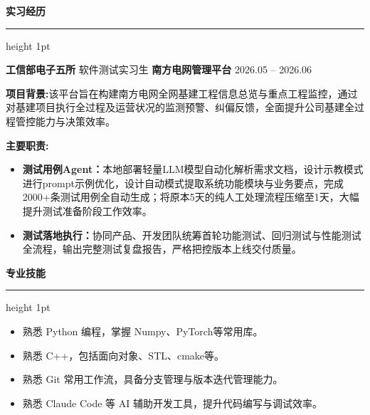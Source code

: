 \documentclass[10pt, a4paper]{ctexart}
\newcommand{\cvsection}[1]{
    \vspace{2ex}
    {\large\bfseries #1}
    \vspace{0.5ex}
    \hrule height 1pt
    \vspace{1.5ex}
}
\begin{document}
\cvsection{\textcolor[HTML]{365F91}{实习经历}}
\textbf{工信部电子五所} \quad \quad 软件测试实习生  \quad \quad \textbf{南方电网管理平台} \hfill 2026.05 -- 2026.06

\textbf{项目背景:}该平台旨在构建南方电网全网基建工程信息总览与重点工程监控，通过对基建项目执行全过程及运营状况的监测预警、纠偏反馈，全面提升公司基建全过程管控能力与决策效率。

\textbf{主要职责:}

\begin{itemize}[leftmargin=1.5em, itemsep=0pt, parsep=0pt, topsep=0.5ex]
\item \textbf{测试用例Agent：}本地部署轻量LLM模型自动化解析需求文档，设计示教模式进行prompt示例优化，设计自动模式提取系统功能模块与业务要点，完成2000+条测试用例全自动生成；将原本5天的纯人工处理流程压缩至1天，大幅提升测试准备阶段工作效率。
\item \textbf{测试落地执行：}协同产品、开发团队统筹首轮功能测试、回归测试与性能测试全流程，输出完整测试复盘报告，严格把控版本上线交付质量。
\end{itemize}

\cvsection{\textcolor[HTML]{365F91}{专业技能 }}
\begin{itemize}[leftmargin=1.5em, itemsep=0pt, parsep=0pt, topsep=0ex]
    \item 熟悉 Python 编程，掌握 Numpy、PyTorch等常用库。 
    \item 熟悉 C++，包括面向对象、STL、cmake等。
    \item 熟悉 Git 常用工作流，具备分支管理与版本迭代管理能力。
    \item 熟悉 Claude Code 等 AI 辅助开发工具，提升代码编写与调试效率。
\end{itemize}


\vspace{0.5em} %
\end{document}
